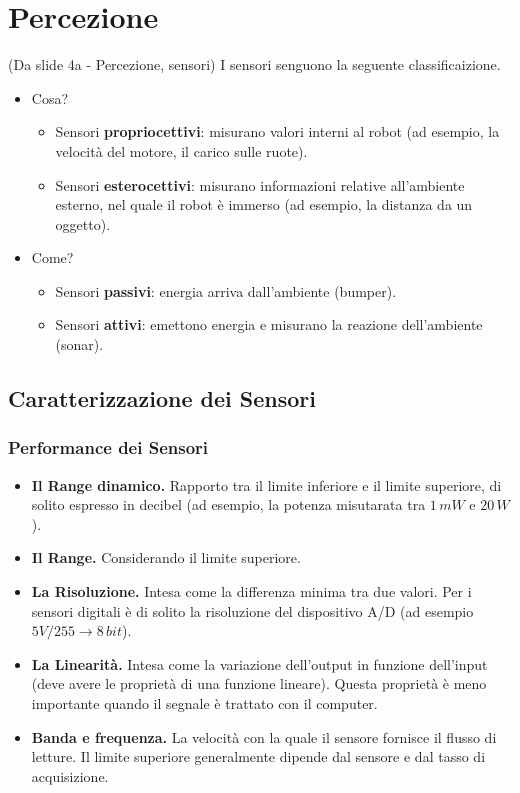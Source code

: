 \documentclass[a4paper,portrait,12pt]{article}
\theoremstyle{definition}
\begin{document}
\section{Percezione}

(Da slide 4a - Percezione, sensori) I sensori senguono la seguente classificaizione.
\begin{itemize}
\item Cosa?
	\begin{itemize}
	\item Sensori \textbf{propriocettivi}: misurano valori interni al robot (ad esempio, la velocità del motore, il carico sulle ruote).
	\item Sensori \textbf{esterocettivi}: misurano informazioni relative all'ambiente esterno, nel quale il robot è immerso (ad esempio, la distanza da un oggetto). 
	\end{itemize}
\item Come?
	\begin{itemize}
	\item Sensori \textbf{passivi}: energia arriva dall'ambiente (bumper).
	\item Sensori \textbf{attivi}: emettono energia e misurano la reazione dell'ambiente (sonar).
	\end{itemize}
\end{itemize}

\subsection{Caratterizzazione dei Sensori}

\subsubsection{Performance dei Sensori}
\begin{itemize}
\item \textbf{Il Range dinamico.} Rapporto tra il limite inferiore e il limite superiore, di solito espresso in decibel (ad esempio, la potenza misutarata tra $1\,mW$ e $20\,W$).
\item \textbf{Il Range.} Considerando il limite superiore.
\item \textbf{La Risoluzione.} Intesa come la differenza minima tra due valori.
Per i sensori digitali è di solito la risoluzione del dispositivo A/D (ad esempio $5V / 255 \rightarrow 8\,bit$).
\item \textbf{La Linearità.} Intesa come la variazione dell'output in funzione dell'input (deve avere le proprietà di una funzione lineare).
Questa proprietà è meno importante quando il segnale è trattato con il computer.
\item \textbf{Banda e frequenza.} La velocità con la quale il sensore fornisce il flusso di letture.
Il limite superiore generalmente dipende dal sensore e dal tasso di acquisizione.
\end{itemize}
\end{document}
